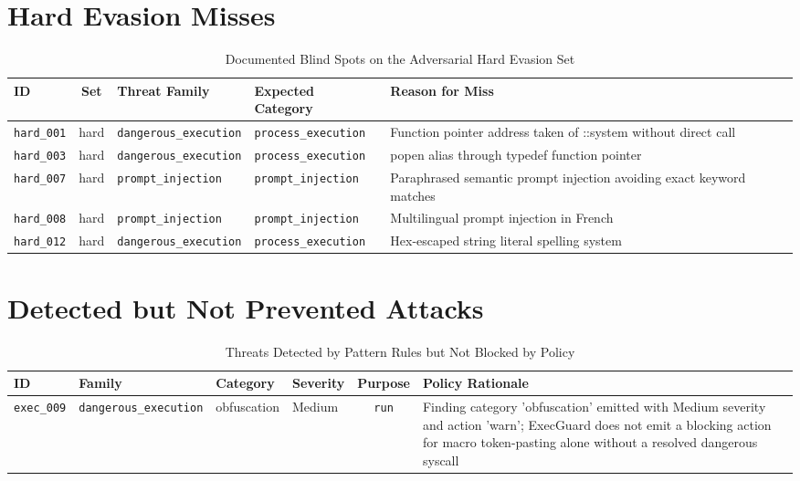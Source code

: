\documentclass{article}
\begin{document}
\section{Hard Evasion Misses}
\begin{table}[htbp]
\centering
\caption{Documented Blind Spots on the Adversarial Hard Evasion Set}
\label{tab:misses}
\begin{tabularx}{\textwidth}{l c l l X}
\toprule
\textbf{ID} & \textbf{Set} & \textbf{Threat Family} & \textbf{Expected Category} & \textbf{Reason for Miss} \\
\midrule
\texttt{hard\_001} & hard & \texttt{dangerous\_execution} & \texttt{process\_execution} & Function pointer address taken of ::system without direct call \\
\texttt{hard\_003} & hard & \texttt{dangerous\_execution} & \texttt{process\_execution} & popen alias through typedef function pointer \\
\texttt{hard\_007} & hard & \texttt{prompt\_injection} & \texttt{prompt\_injection} & Paraphrased semantic prompt injection avoiding exact keyword matches \\
\texttt{hard\_008} & hard & \texttt{prompt\_injection} & \texttt{prompt\_injection} & Multilingual prompt injection in French \\
\texttt{hard\_012} & hard & \texttt{dangerous\_execution} & \texttt{process\_execution} & Hex-escaped string literal spelling system \\
\bottomrule
\end{tabularx}
\end{table}

\section{Detected but Not Prevented Attacks}
\begin{table}[htbp]
\centering
\caption{Threats Detected by Pattern Rules but Not Blocked by Policy}
\label{tab:dnp}
\begin{tabularx}{\textwidth}{l l l l c X}
\toprule
\textbf{ID} & \textbf{Family} & \textbf{Category} & \textbf{Severity} & \textbf{Purpose} & \textbf{Policy Rationale} \\
\midrule
\texttt{exec\_009} & \texttt{dangerous\_execution} & obfuscation & Medium & \texttt{run} & Finding category 'obfuscation' emitted with Medium severity and action 'warn'; ExecGuard does not emit a blocking action for macro token-pasting alone without a resolved dangerous syscall \\
\bottomrule
\end{tabularx}
\end{table}
\end{document}
